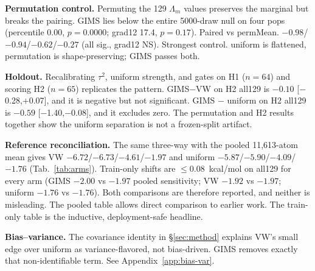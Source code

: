 \documentclass{article}
\begin{document}
\textbf{Permutation control.} Permuting the 129 $\Lambda_m$ values preserves the
marginal but breaks the pairing. GIMS lies below the entire 5000-draw null on
four pops (percentile 0.00, $p=0.0000$; grad12 17.4, $p=0.17$). Paired vs
permMean. $-0.98$/$-0.94$/$-0.62$/$-0.27$ (all sig., grad12 NS). Strongest control.
uniform is flattened, permutation is shape-preserving; GIMS passes both.

\textbf{Holdout.} Recalibrating $\tau^2$, uniform strength, and gates on H1
($n=64$) and scoring H2 ($n=65$) replicates the pattern. GIMS$-$VW on H2
all129 is $-0.10$ [$-$0.28,$+$0.07], and it is negative but not significant. GIMS
$-$ uniform on H2 all129 is $-0.59$ [$-$1.40,$-$0.08], and it excludes zero.
The permutation and H2 results together show the uniform separation is not a
frozen-split artifact.

\textbf{Reference reconciliation.} The same three-way with the pooled
11{,}613-atom mean gives VW $-6.72$/$-6.73$/$-4.61$/$-1.97$ and uniform
$-5.87$/$-5.90$/$-4.09$/$-1.76$ (Tab.~\ref{tab:arms}). Train-only shifts are
$\le0.08$~kcal/mol on all129 for every arm (GIMS $-2.00$ vs $-1.97$ pooled
sensitivity; VW $-1.92$ vs $-1.97$; uniform $-1.76$ vs $-1.76$). Both
comparisons are therefore reported, and neither is misleading. The pooled table
allows direct comparison to earlier work. The train-only table is the
inductive, deployment-safe headline.

\textbf{Bias--variance.} The covariance identity in \S\ref{sec:method} explains VW's small edge over uniform as
variance-flavored, not bias-driven. GIMS removes exactly that non-identifiable term. See
Appendix~\ref{app:bias-var}.
\end{document}
